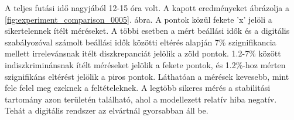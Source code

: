 A teljes futási idő nagyjából 12-15 óra volt. A kapott eredményeket ábrázolja a \ref{fig:experiment_comparison_0005}. ábra.
A pontok közül fekete 'x' jelöli a sikertelennek ítélt méréseket. A többi esetben a mért beállási idők és a digitális 
szabályozóval számolt beállási idők közötti eltérés alapján 7\% szignifikancia mellett irrelevánsnak itélt diszkrepanciát 
jelölik a zöld pontok. 1.2-7\% között indiszkriminánsnak ítélt méréseket jelölik a fekete pontok, és 1.2\%-hoz mérten 
szignifikáns eltérést jelölik a piros pontok. Láthatóan a mérések kevesebb, mint fele felel meg ezeknek a feltételeknek. 
A legtöbb sikeres mérés a stabilitási tartomány azon területén található, ahol a modellezett relatív hiba negatív. Tehát 
a digitális rendszer az elvártnál gyorsabban áll be. 
